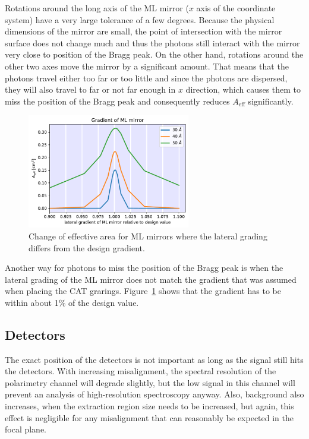 \documentclass[]{spie}  %
\begin{document}
Rotations around the long axis of the ML mirror ($x$ axis of the
coordinate system) have a very large tolerance of a few
degrees. Because the physical dimensions of the mirror are small, the
point of intersection with the mirror surface does not change much and
thus the photons still interact with the mirror very close to position
of the Bragg peak. On the other hand, rotations around the other two
axes move the mirror by a significant amount. That means that the
photons travel either too far or too little and since the photons are
dispersed, they will also travel to far or not far enough in $x$
direction, which causes them to miss the position of the Bragg peak
and consequently reduces $A_{\mathrm{eff}}$ significantly.

\begin{figure} [ht]
  \begin{center}
    \includegraphics[height=5cm]{LGML_gradient.pdf}
  \end{center}
  \caption
      { \label{fig:LGML_gradient}Change of effective area for ML mirrors where the lateral grading differs from the design gradient.
}
\end{figure}

Another way for photons to miss the position of the Bragg peak is when
the lateral grading of the ML mirror does not match the gradient that
was assumed when placing the CAT
grarings. Figure~\ref{fig:LGML_gradient} shows that the gradient has
to be within about 1\% of the design value.

\subsection{Detectors}
The exact position of the detectors is not important as long as the
signal still hits the detectors. With increasing misalignment, the
spectral resolution of the polarimetry channel will degrade slightly,
but the low signal in this channel will prevent an analysis of
high-resolution spectroscopy anyway. Also, background also increases,
when the extraction region size needs to be increased, but again, this
effect is negligible for any misalignment that can reasonably be
expected in the focal plane.
\end{document}
